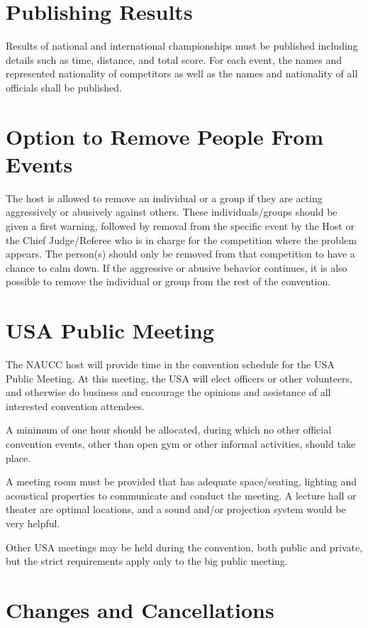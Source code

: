 \section{Publishing Results \label{sec:publishing_results}}
Results of national and international championships must be published including details such as time, distance, and total score.
For each event, the names and represented nationality of competitors as well as the names and nationality of all officials shall be published.

\section{Option to Remove People From Events}
The host is allowed to remove an individual or a group if they are acting aggressively or abusively against others.
These individuals/groups should be given a first warning, followed by removal from the specific event by the Host or the Chief Judge/Referee who is in charge for the competition where the problem appears.
The person(s) should only be removed from that competition to have a chance to calm down.
If the aggressive or abusive behavior continues, it is also possible to remove the individual or group from the rest of the convention.

\section{USA Public Meeting}

The NAUCC host will provide time in the convention schedule for the USA Public Meeting.
At this meeting, the USA will elect officers or other volunteers, and otherwise do business and encourage the opinions and assistance of all interested convention attendees.

A minimum of one hour should be allocated, during which no other official convention events, other than open gym or other informal activities, should take place.

A meeting room must be provided that has adequate space/seating, lighting and acoustical properties to communicate and conduct the meeting.
A lecture hall or theater are optimal locations, and a sound and/or projection system would be very helpful.

Other USA meetings may be held during the convention, both public and private, but the strict requirements apply only to the big public meeting.

\section{Changes and Cancellations}

